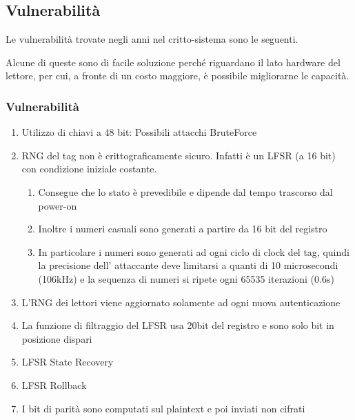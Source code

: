 \subsection{Vulnerabilità}

\begin{frame}
    Le vulnerabilità trovate negli anni nel critto-sistema sono le seguenti.

    Alcune di queste sono di facile soluzione perché riguardano il lato hardware del lettore,
    per cui, a fronte di un costo maggiore, è possibile migliorarne le capacità.
\end{frame}

\begin{frame}
    \frametitle{Vulnerabilità}
    \scriptsize
    \begin{enumerate}
        \item <1-> Utilizzo di chiavi a 48 bit: Possibili attacchi BruteForce \cite{courtois2008algebraic}\label{enum:keylength}
        \item <2-> RNG del tag non è crittograficamente sicuro. Infatti è un LFSR (a 16 bit)~\cite{garcia2008dismantling} con condizione iniziale costante.\label{enum:rng-16-bit}
        \begin{enumerate} \scriptsize
            \item <3-> Consegue che lo stato è prevedibile e dipende dal tempo trascorso dal power-on~\cite{garcia2008dismantling}\cite{courtois2008algebraic}\label{enum:rng-constant-seed}
            \item <4-> Inoltre i numeri casuali sono generati a partire da 16 bit del registro 
            \item <5-> In particolare i numeri sono generati ad ogni ciclo di clock del tag, quindi la precisione dell' attaccante deve limitarsi a quanti di 10 microsecondi (106kHz) e la sequenza di numeri si ripete ogni 65535 iterazioni (0.6s)
        \end{enumerate}
        \item <6-> L'RNG dei lettori viene aggiornato solamente ad ogni nuova autenticazione~\cite{garcia2008dismantling}\label{enum:rng-reader-update}
        \item <7-> La funzione di filtraggio del LFSR usa 20bit del registro e sono solo bit in posizione dispari
        \item <8-> LFSR State Recovery
        \item <9-> LFSR Rollback
        \item <10-> I bit di parità sono computati sul plaintext e poi inviati non cifrati
    \end{enumerate}
\end{frame}
